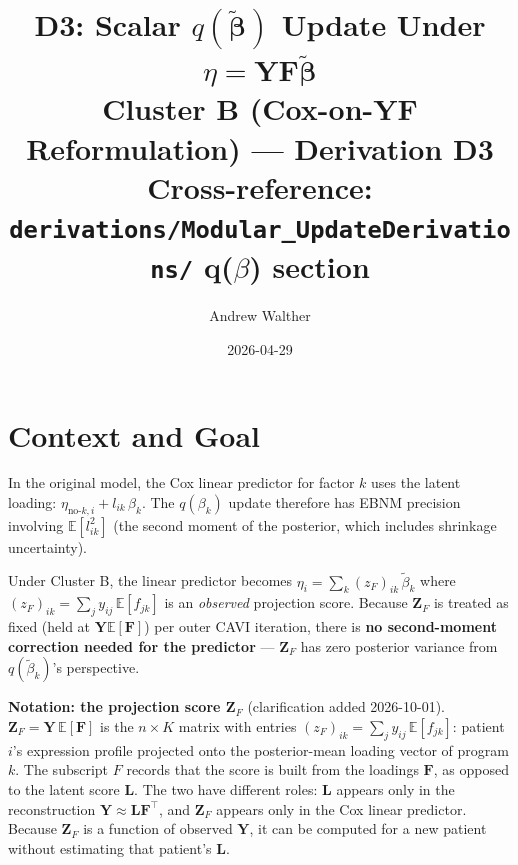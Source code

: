 \documentclass[11pt]{article}
\title{\textbf{D3: Scalar $q(\tilde{\boldsymbol{\beta}})$ Update Under $\eta = \mathbf{Y}\mathbf{F}\tilde{\boldsymbol{\beta}}$}\\[4pt]
\large Cluster B (Cox-on-YF Reformulation) — Derivation D3\\[2pt]
\normalsize Cross-reference: \texttt{derivations/Modular\_UpdateDerivations/} q($\beta$) section}
\author{Andrew Walther}
\date{2026-04-29}
\newcommand{\E}{\mathbb{E}}
\begin{document}
\maketitle
\tableofcontents
\newpage

\section{Context and Goal}

In the original model, the Cox linear predictor for factor $k$ uses the latent loading:
$\eta_{\text{no-}k,i} + l_{ik}\,\beta_k$. The $q(\beta_k)$ update therefore has EBNM
precision involving $\E[l_{ik}^2]$ (the second moment of the posterior, which includes
shrinkage uncertainty).

\bigskip
Under Cluster B, the linear predictor becomes $\eta_i = \sum_k (z_F)_{ik}\,\tilde\beta_k$
where $(z_F)_{ik} = \sum_j y_{ij}\,\E[f_{jk}]$ is an \emph{observed} projection score.
Because $\mathbf{Z}_F$ is treated as fixed (held at $\mathbf{Y}\E[\mathbf{F}]$) per outer
CAVI iteration, there is \textbf{no second-moment correction needed for the predictor} —
$\mathbf{Z}_F$ has zero posterior variance from $q(\tilde\beta_k)$'s perspective.

\bigskip
\textbf{Notation: the projection score $\mathbf{Z}_F$} (clarification added 2026-10-01).
$\mathbf{Z}_F = \mathbf{Y}\,\E[\mathbf{F}]$ is the $n\times K$ matrix with entries
$(z_F)_{ik} = \sum_j y_{ij}\,\E[f_{jk}]$: patient $i$'s expression profile projected onto
the posterior-mean loading vector of program $k$. The subscript $F$ records that the score
is built from the loadings $\mathbf{F}$, as opposed to the latent score $\mathbf{L}$.
The two have different roles: $\mathbf{L}$ appears only in the reconstruction
$\mathbf{Y}\approx\mathbf{L}\mathbf{F}^\top$, and $\mathbf{Z}_F$ appears only in the Cox
linear predictor. Because $\mathbf{Z}_F$ is a function of observed $\mathbf{Y}$, it can be
computed for a new patient without estimating that patient's $\mathbf{L}$.
\end{document}
